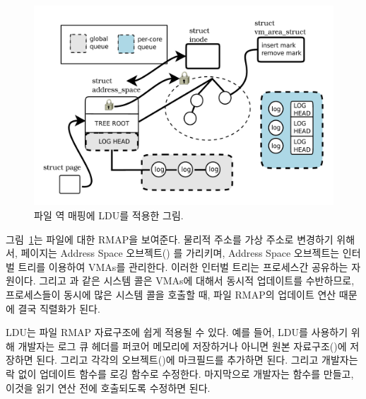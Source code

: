 \begin{figure}[tb]
  \begin{center}
     \includegraphics[width=1\textwidth,height=1\textheight,keepaspectratio]{fig/file_rmap}
  \end{center}
  \caption{파일 역 매핑에 LDU를 적용한 그림.}
  \label{fig:fileramp}
\end{figure}

그림~\ref{fig:fileramp}는 파일에 대한 RMAP을 보여준다.
물리적 주소를 가상 주소로 변경하기 위해서, 페이지는 Address Space 오브젝트()
를 가리키며, Address Space 오브젝트는 인터벌 트리를 이용하여 VMAs를 관리한다.
이러한 인터벌 트리는 프로세스간 공유하는 자원이다. 
 그리고 과 같은 시스템 콜은 VMAs에 대해서 동시적 업데이트를 
수반하므로, 프로세스들이 동시에 많은 시스템 콜을 호출할 때, 
파일 RMAP의 업데이트 연산 때문에 결국 직렬화가 된다. 

LDU는 파일 RMAP 자료구조에 쉽게 적용될 수 있다. 
예를 들어, LDU를 사용하기 위해 개발자는 로그 큐 헤더를 퍼코어 메모리에 저장하거나 
아니면 원본 자료구조()에 저장하면 된다.
그리고 각각의 오브젝트()에 마크필드를 추가하면 된다. 
그리고 개발자는 락 없이 업데이트 함수를 로깅 함수로 수정한다.  
마지막으로 개발자는  함수를 만들고, 이것을 읽기 연산 전에 호출되도록 수정하면 된다.

